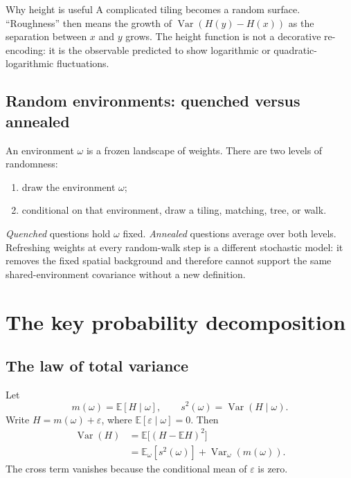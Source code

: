 \documentclass[11pt,a4paper,oneside,openany]{memoir}
\newcommand{\E}{\mathbb{E}}
\newcommand{\Var}{\operatorname{Var}}
\newcommand{\1}{\bm{1}}
\begin{document}
\begin{bigidea}{Why height is useful}
A complicated tiling becomes a random surface. ``Roughness'' then means the
growth of $\Var(H(y)-H(x))$ as the separation between $x$ and $y$ grows.
The height function is not a decorative re-encoding: it is the observable
predicted to show logarithmic or quadratic-logarithmic fluctuations.
\end{bigidea}

\section{Random environments: quenched versus annealed}

An environment $\omega$ is a frozen landscape of weights. There are two
levels of randomness:

\begin{enumerate}
  \item draw the environment $\omega$;
  \item conditional on that environment, draw a tiling, matching, tree, or walk.
\end{enumerate}

\emph{Quenched} questions hold $\omega$ fixed. \emph{Annealed} questions average
over both levels. Refreshing weights at every random-walk step is a different
stochastic model: it removes the fixed spatial background and therefore cannot
support the same shared-environment covariance without a new definition.

\chapter{The key probability decomposition}
\label{chap:decomposition}

\section{The law of total variance}

Let
\[
  m(\omega)=\E[H\mid\omega],
  \qquad
  s^2(\omega)=\Var(H\mid\omega).
\]
Write $H=m(\omega)+\varepsilon$, where
$\E[\varepsilon\mid\omega]=0$. Then
\begin{align*}
\Var(H)
&=\E\bigl[(H-\E H)^2\bigr]\\
&=\E_\omega[s^2(\omega)]+\Var_\omega(m(\omega)).
\end{align*}
The cross term vanishes because the conditional mean of $\varepsilon$ is zero.
\end{document}
